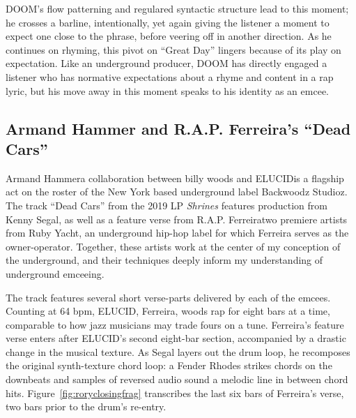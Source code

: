DOOM's flow patterning and regulared syntactic structure lead to this moment; he crosses a barline, 
intentionally, yet again giving the listener a moment to expect one close to the phrase, before veering
off in another direction. As he continues on rhyming, this pivot on ``Great Day'' lingers because of its
play on expectation. Like an underground producer, DOOM has directly engaged a listener who has normative
expectations about a rhyme and content in a rap lyric, but his move away in this moment speaks to his
identity as an emcee.

{}
\subsection*{\centering Armand Hammer and R.A.P. Ferreira's ``Dead Cars''}

Armand Hammer\textemdash a collaboration between billy woods and ELUCID\textemdash is a flagship act on
the roster of the New York based underground label Backwoodz Studioz. The track ``Dead Cars'' from the 
2019 LP \textit{Shrines} features production from Kenny Segal, as well as a feature verse from R.A.P. 
Ferreira\textemdash two premiere artists from Ruby Yacht, an underground hip-hop label for which Ferreira
serves as the owner-operator. Together, these artists work at the center of my conception of the underground,
and their techniques deeply inform my understanding of underground emceeing.

The track features several short verse-parts delivered by each of the emcees. Counting at 64 bpm, ELUCID, 
Ferreira, woods  rap for eight bars at a time, comparable to how jazz musicians may trade fours on a tune.
Ferreira's feature verse enters after ELUCID's second eight-bar section, accompanied by a drastic change 
in the musical texture. As Segal layers out the drum loop, he recomposes the original synth-texture chord
loop: a Fender Rhodes strikes chords on the downbeats and samples of reversed audio sound a melodic line
in between chord hits. Figure~\ref{fig:roryclosingfrag} transcribes the last six bars of Ferreira's verse, 
two bars prior to the drum's re-entry.

